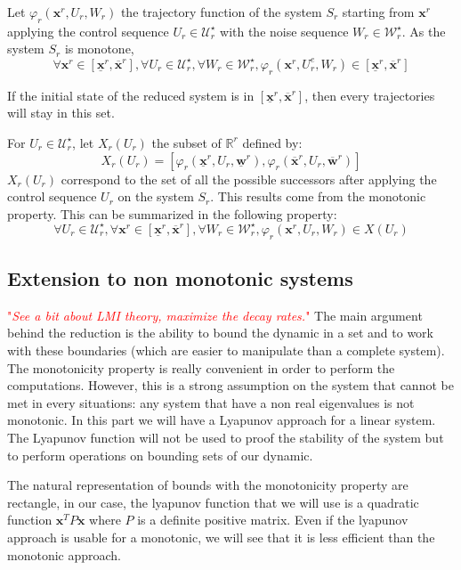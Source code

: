 \documentclass{article}
\theoremstyle{named}
\newcommand{\vect}[1]{\ensuremath{ \mathbf{#1}}}
\newcommand\comment[1]{\textcolor{red}{"\textit{#1}"}}
\begin{document}
Let $\varphi_r (\mathbf{x}^r,U_r,W_r)$ the trajectory function of the system $S_r$ starting from $\mathbf{x}^r$
applying the control sequence $U_r \in \mathcal{U}_r^\star$
with the noise sequence $W_r \in \mathcal{W}_r^\star$.
As the system $S_r$ is monotone,
$$
\forall \mathbf{x}^r \in \left [\underline{\mathbf{x}}^r, \overline{\mathbf{x}}^r \right ],
\forall U_r \in \mathcal{U}_r^\star,
\forall W_r \in \mathcal{W}_r^\star,
\varphi_r(\mathbf{x}^r,U_r^e,W_r)
\in \left [\underline{\mathbf{x}}^r, \overline{\mathbf{x}}^r \right ]$$

If the initial state of the reduced system is in $\left [\underline{\mathbf{x}}^r, \overline{\mathbf{x}}^r \right ]$, then every trajectories will stay in this set.

For $U_r \in \mathcal{U}_r^\star$, let $X_r(U_r)$ the subset of $\mathbb{R}^r$ defined by:
\begin{equation}
X_r(U_r) = \left [ 
\varphi_r(\underline{\mathbf{x}}^r,U_r,\underline{\mathbf{w}}^r),
\varphi_r(\overline{\mathbf{x}}^r,U_r,\overline{\mathbf{w}}^r)
\right ]
\end{equation}
$X_r(U_r)$ correspond to the set of all the possible successors after applying the control sequence $U_r$ on the system $S_r$. This results come from the monotonic property.
This can be summarized in the following property:
$$
\forall U_r \in \mathcal{U}_r^\star,
\forall \mathbf{x}^r \in \left [\underline{\mathbf{x}}^r, \overline{\mathbf{x}}^r \right ],
\forall W_r \in \mathcal{W}_r^\star,
\varphi_r(\mathbf{x}^r,U_r,W_r)
\in X(U_r)$$

\subsection{Extension to non monotonic systems}
\comment{See a bit about LMI theory, maximize the decay rates.}
The main argument behind the reduction is the ability to bound the dynamic in a set and to work with these boundaries (which are easier to manipulate than a complete system).
The monotonicity property is really convenient in order to perform the computations.
However, this is a strong assumption on the system that cannot be met in every situations: any system that have a non real eigenvalues is not monotonic.
In this part we will have a Lyapunov approach for a linear system.
The Lyapunov function will not be used to proof the stability of the system but to perform operations on bounding sets of our dynamic.

The natural representation of bounds with the monotonicity property are rectangle, in our case, the lyapunov function that we will use is a quadratic function $\vect{x}^T P \vect{x}$ where $P$ is a definite positive matrix.
Even if the lyapunov approach is usable for a monotonic, we will see that it is less efficient than the monotonic approach.
\end{document}
